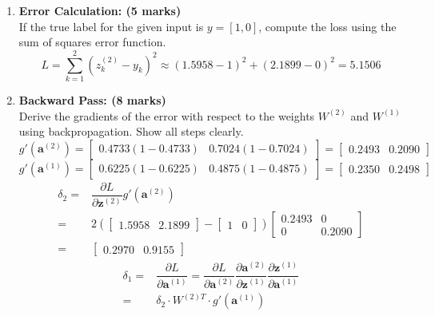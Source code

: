 \documentclass[12pt]{article}
\begin{document}
\begin{enumerate}[font=\Large]
	\item \textbf{Error Calculation: (5 marks)} \\
	      If the true label for the given input is $y=[1,0]$, compute the loss using the sum of squares error function.
	      $$
		      L = \sum_{k=1}^2 (z_k^{(2)} - y_k)^2 \approx (1.5958 - 1)^2+(2.1899 - 0)^2 = 5.1506
	      $$
	      \newpage
	\item \textbf{Backward Pass: (8 marks)}\\
	      Derive the gradients of the error with respect to the weights $W^{(2)}$ and $W^{(1)}$ using backpropagation. Show all steps clearly.
	      $$g'(\mathbf{a}^{(2)})=\begin{bmatrix} 0.4733(1-0.4733) & 0.7024(1-0.7024) \end{bmatrix}=\begin{bmatrix} 0.2493 & 0.2090 \end{bmatrix}$$
	      $$g'(\mathbf{a}^{(1)})=\begin{bmatrix} 0.6225(1-0.6225) &  0.4875(1- 0.4875) \end{bmatrix}=\begin{bmatrix} 0.2350 & 0.2498 \end{bmatrix}$$
	      $$
		      \begin{aligned}
			      \delta_2= & \dfrac{\partial L}{\partial \mathbf{z}^{(2)}} g'(\mathbf{a}^{(2)})                                                                      \\
			      =         & 2(\begin{bmatrix} 1.5958 & 2.1899 \end{bmatrix}-\begin{bmatrix} 1 & 0 \end{bmatrix}) \begin{bmatrix} 0.2493 &0\\0& 0.2090 \end{bmatrix} \\
			      =         & \begin{bmatrix} 0.2970 & 0.9155 \end{bmatrix}
		      \end{aligned}$$
	      $$
		      \begin{aligned}
			      \delta_1= & \dfrac{\partial L}{\partial \mathbf{a}^{(1)}} =\dfrac{\partial L}{\partial \mathbf{a}^{(2)}}\dfrac{\partial \mathbf{a}^{(2)}}{\partial \mathbf{z}^{(1)}}\dfrac{\partial \mathbf{z}^{(1)}}{\partial \mathbf{a}^{(1)}} \\
			      =         & \delta_2\cdot W^{(2)T}\cdot g'(\mathbf{a}^{(1)})                                                                                                                                                                     \\

\end{aligned}$$
\end{enumerate}
\end{document}
